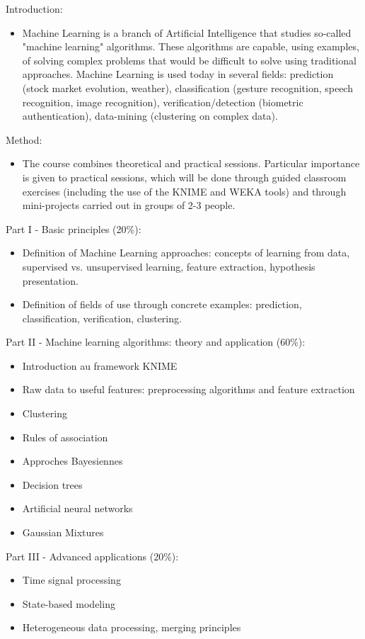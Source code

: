 Introduction:
\begin{itemize}
    \item Machine Learning is a branch of Artificial Intelligence that studies so-called "machine learning" algorithms. These algorithms are capable, using examples, of solving complex problems that would be difficult to solve using traditional approaches. Machine Learning is used today in several fields: prediction (stock market evolution, weather), classification (gesture recognition, speech recognition, image recognition), verification/detection (biometric authentication), data-mining (clustering on complex data).
\end{itemize}
Method:
\begin{itemize}
    \item The course combines theoretical and practical sessions. Particular importance is given to practical sessions, which will be done through guided classroom exercises (including the use of the KNIME and WEKA tools) and through mini-projects carried out in groups of 2-3 people.
\end{itemize}
Part I - Basic principles (20\%):
\begin{itemize}
    \item Definition of Machine Learning approaches: concepts of learning from data, supervised vs. unsupervised learning, feature extraction, hypothesis presentation.
    \item Definition of fields of use through concrete examples: prediction, classification, verification, clustering.
\end{itemize}
Part II - Machine learning algorithms: theory and application (60\%):
\begin{itemize}
    \item Introduction au framework KNIME
    \item Raw data to useful features: preprocessing algorithms and feature extraction
    \item Clustering
    \item Rules of association
    \item Approches Bayesiennes
    \item Decision trees
    \item Artificial neural networks
    \item Gaussian Mixtures
\end{itemize}
Part III - Advanced applications (20\%):
\begin{itemize}
    \item Time signal processing
    \item State-based modeling
    \item Heterogeneous data processing, merging principles
\end{itemize}